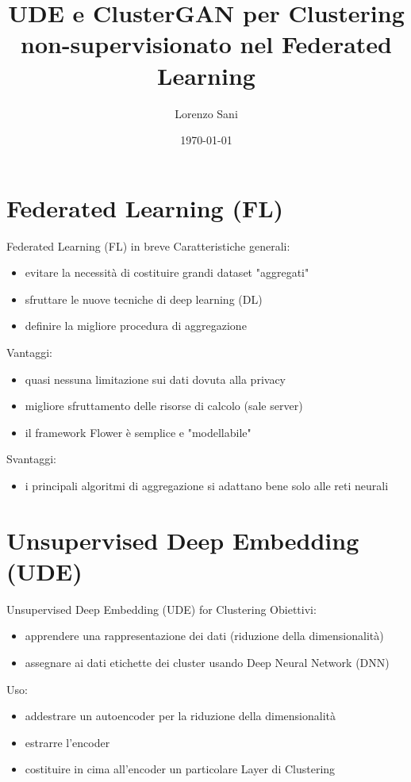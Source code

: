 \documentclass{beamer}
\title[Unsupervised Clustering in Federated Learning]{UDE e ClusterGAN per Clustering non-supervisionato nel Federated Learning}
\author{Lorenzo Sani}
\institute{Università degli Studi di Bologna}
\date{\today}
\begin{document}
\begin{frame}
  \titlepage
\end{frame}


\section{Federated Learning (FL)}

\begin{frame}{Federated Learning (FL) in breve}
	Caratteristiche generali:
	\cite{9153560}
	\cite{mcmahan2017communicationefficient}
	\begin{itemize}
		\item evitare la necessità di costituire grandi dataset "aggregati"
		\item sfruttare le nuove tecniche di deep learning (DL)
		\item definire la migliore procedura di aggregazione
	\end{itemize}
	Vantaggi:
	\begin{itemize}
		\item quasi nessuna limitazione sui dati dovuta alla privacy
		\item migliore sfruttamento delle risorse di calcolo (sale server)
		\item il framework Flower è semplice e "modellabile" \cite{beutel2021flower}
	\end{itemize}
	Svantaggi:
	\begin{itemize}
		\item i principali algoritmi di aggregazione si adattano bene solo alle reti neurali
	\end{itemize}
\end{frame}

\section{Unsupervised Deep Embedding (UDE)}

\begin{frame}{Unsupervised Deep Embedding (UDE) for Clustering}
	Obiettivi:\cite{DBLP:journals/corr/XieGF15}
	\begin{itemize}
		\item apprendere una rappresentazione dei dati (riduzione della dimensionalità)
		\item assegnare ai dati etichette dei cluster usando Deep Neural Network (DNN)
	\end{itemize}
	Uso:
	\begin{itemize}
		\item addestrare un autoencoder per la riduzione della dimensionalità
		\item estrarre l'encoder
		\item costituire in cima all'encoder un particolare Layer di Clustering
	\end{itemize}
\end{frame}
\end{document}
